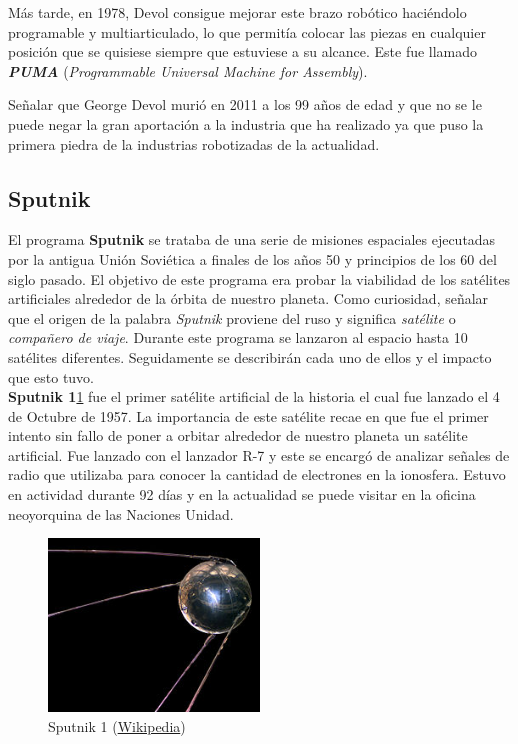 Más tarde, en 1978, Devol consigue mejorar este brazo robótico haciéndolo programable y multiarticulado, lo que permitía colocar las piezas en cualquier posición que se quisiese siempre que estuviese a su alcance. Este fue llamado \textbf{\textit{PUMA}} (\textit{Programmable Universal Machine for Assembly}).

Señalar que George Devol murió en 2011 a los 99 años de edad y que no se le puede negar la gran aportación a la industria que ha realizado ya que puso la primera piedra de la industrias robotizadas de la actualidad.






\subsection{Sputnik}

El programa \textbf{Sputnik} se trataba de una serie de misiones espaciales ejecutadas por la antigua Unión Soviética a finales de los años 50 y principios de los 60 del siglo pasado. El objetivo de este programa era probar la viabilidad de los satélites artificiales alrededor de la órbita de nuestro planeta.
Como curiosidad, señalar que el origen de la palabra \textit{Sputnik} proviene del ruso y significa \textit{satélite} o \textit{compañero de viaje}.
Durante este programa se lanzaron al espacio hasta 10 satélites diferentes. Seguidamente se describirán cada uno de ellos y el impacto que esto tuvo.\\


\textbf{Sputnik 1}\ref{s1} fue el primer satélite artificial de la historia el cual fue lanzado el 4 de Octubre de 1957. La importancia de este satélite recae en que fue el primer intento sin fallo de poner a orbitar alrededor de nuestro planeta un satélite artificial. Fue lanzado con el lanzador R-7 y este se encargó de analizar señales de radio que utilizaba para conocer la cantidad de electrones en la ionosfera. Estuvo en actividad durante 92 días y en la actualidad se puede visitar en la oficina neoyorquina de las Naciones Unidad.\\ 

\begin{figure}[H]
\begin{center}
  \includegraphics[width=0.5\textwidth]{./EtapaPrimeriza/imagenes/s1.jpg}
  \caption{Sputnik 1 (\href{https://es.wikipedia.org/wiki/Sputnik\_1\#/media/File:Sputnik\_asm.jpg} {Wikipedia})}
  \label{s1}
\end{center}
\end{figure}

